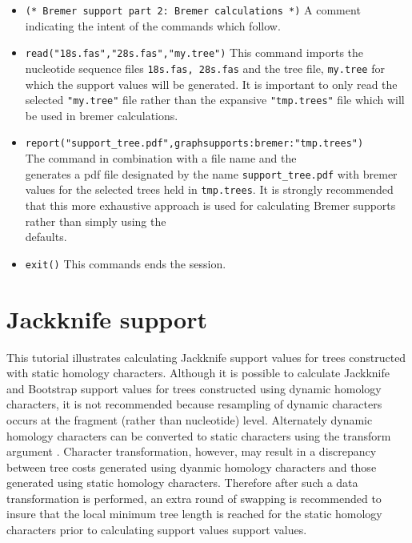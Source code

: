 \begin{itemize}
\item \texttt{(* Bremer support part 2: Bremer calculations *)}  A comment indicating the intent of the commands which follow.
\item \texttt{read("18s.fas","28s.fas","my.tree")} This command imports the nucleotide sequence files \texttt{18s.fas, 28s.fas} and the tree file, \texttt{my.tree} for which the support values will be generated.  It is important to only read the selected \texttt{"my.tree"} file rather than the expansive  \texttt{"tmp.trees"} file which will be used in bremer calculations.
\item \texttt{report("support\_tree.pdf",graphsupports:bremer:"tmp.trees")} \\The {} command in combination with a file name and the \\  generates a pdf file designated by the name \texttt{support\_tree.pdf} with bremer values for the selected trees held in \texttt{tmp.trees}.  It is strongly recommended that this more exhaustive approach is used for calculating Bremer supports rather than simply using the \\  defaults.  
\item \texttt{exit()} This commands ends the \poy session.
\end{itemize}

\section{Jackknife support}{\label{tutorial 4}}

This tutorial illustrates calculating Jackknife support values for trees constructed with static homology characters.  Although it is possible to calculate Jackknife and Bootstrap support values 
for trees constructed using dynamic homology characters, it is not recommended because resampling of dynamic characters occurs at the fragment (rather than nucleotide) level. Alternately dynamic homology characters can be converted to static characters using the transform argument .  Character transformation, however, may result in a discrepancy between tree costs generated using dyanmic homology characters and those generated using static homology characters. Therefore after such a data transformation is performed, an extra round of swapping is recommended to insure that the local minimum tree length is reached for the static homology characters prior to calculating support values  support values.

